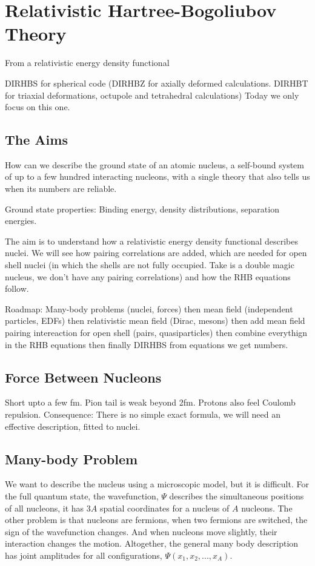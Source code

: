 \chapter{Relativistic Hartree-Bogoliubov Theory}

From a relativistic energy density functional


DIRHBS for spherical code (DIRHBZ for axially deformed calculations. DIRHBT for triaxial deformations, octupole and tetrahedral calculations)
Today we only focus on this one. 

\section{The Aims}
How can we describe the ground state of an atomic nucleus, a self-bound system of up to a few hundred interacting nucleons, with a single theory that also tells us when its numbers are reliable. 

Ground state properties: Binding energy, density distributions, separation energies. 

The aim is to understand how a relativistic energy density functional describes nuclei. We will see how pairing correlations are added, which are needed for open shell nuclei (in which the shells are not fully occupied. Take  is a double magic nucleus, we don't have any pairing correlations) and how the RHB equations follow. 

Roadmap: Many-body problems (nuclei, forces) then mean field (independent particles, EDFs) then relativistic mean field (Dirac, mesons) then add mean field pairing intereaction for open shell (pairs, quasiparticles) then combine everythign in the RHB equations then finally DIRHBS from equations we get numbers. 


\section{Force Between Nucleons}
Short upto a few fm. Pion tail is weak beyond 2fm. Protons also feel Coulomb repulsion. Consequence: There is no simple exact formula, we will need an effective description, fitted to nuclei. 

\section{Many-body Problem}
We want to describe the nucleus using a microscopic model, but it is difficult. For the full quantum state, the wavefunction, \(\Psi\) describes the simultaneous positions of all nucleons, it has \(3A\) spatial coordinates for a nucleus of \(A\) nucleons. The other problem is that nucleons are fermions, when two fermions are switched, the sign of the wavefunction changes. And when nucleons move slightly, their interaction changes the motion. Altogether, the general many body description has joint amplitudes for all configurations, \(\Psi(x_1,x_2,...,x_A)\).

